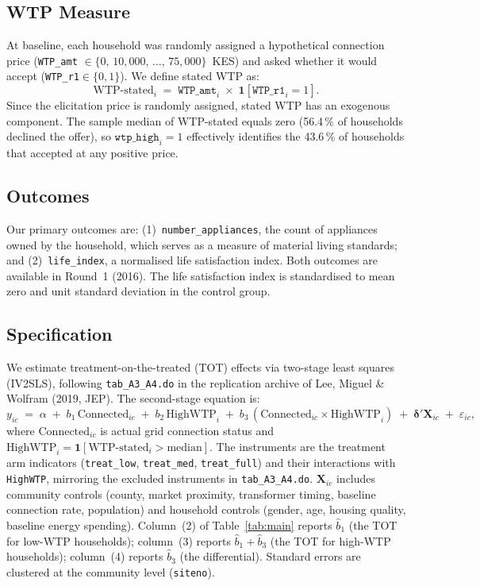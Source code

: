 \documentclass[12pt]{article}
\begin{document}
\subsection*{WTP Measure}

At baseline, each household was randomly assigned a hypothetical connection
price (\texttt{WTP\_amt} $\in \{0,\,10{,}000,\,\ldots,\,75{,}000\}$~KES)
and asked whether it would accept (\texttt{WTP\_r1}$\in\{0,1\}$). We
define stated WTP as:
\begin{equation}
\label{eq:wtp}
\text{WTP-stated}_i \;=\; \texttt{WTP\_amt}_i
  \;\times\; \mathbf{1}[\texttt{WTP\_r1}_i = 1].
\end{equation}
Since the elicitation price is randomly assigned, stated WTP has an
exogenous component. The sample median of WTP-stated equals zero (56.4\,\%
of households declined the offer), so
$\texttt{wtp\_high}_i = 1$ effectively identifies the 43.6\,\% of
households that accepted at any positive price.

\subsection*{Outcomes}

Our primary outcomes are: (1)~\texttt{number\_appliances}, the count of
appliances owned by the household, which serves as a measure of material
living standards; and (2)~\texttt{life\_index}, a normalised life
satisfaction index. Both outcomes are available in Round~1 (2016). The
life satisfaction index is standardised to mean zero and unit standard
deviation in the control group.

\subsection*{Specification}

We estimate treatment-on-the-treated (TOT) effects via two-stage least
squares (IV2SLS), following \texttt{tab\_A3\_A4.do} in the replication
archive of Lee, Miguel \& Wolfram (2019, JEP). The second-stage equation
is:
\begin{equation}
\label{eq:spec}
y_{ic} \;=\; \alpha
  \;+\; b_1\,\text{Connected}_{ic}
  \;+\; b_2\,\text{HighWTP}_{i}
  \;+\; b_3\,(\text{Connected}_{ic} \times \text{HighWTP}_{i})
  \;+\; \boldsymbol{\delta}'\mathbf{X}_{ic}
  \;+\; \varepsilon_{ic},
\end{equation}
where $\text{Connected}_{ic}$ is actual grid connection status and
$\text{HighWTP}_i = \mathbf{1}[\text{WTP-stated}_i > \text{median}]$.
The instruments are the treatment arm indicators
(\texttt{treat\_low}, \texttt{treat\_med}, \texttt{treat\_full}) and
their interactions with \texttt{HighWTP}, mirroring the excluded
instruments in \texttt{tab\_A3\_A4.do}. $\mathbf{X}_{ic}$ includes
community controls (county, market proximity, transformer timing, baseline
connection rate, population) and household controls (gender, age, housing
quality, baseline energy spending). Column~(2) of Table~\ref{tab:main}
reports $\hat{b}_1$ (the TOT for low-WTP households); column~(3) reports
$\hat{b}_1+\hat{b}_3$ (the TOT for high-WTP households); column~(4)
reports $\hat{b}_3$ (the differential). Standard errors are clustered at
the community level (\texttt{siteno}).
\end{document}
